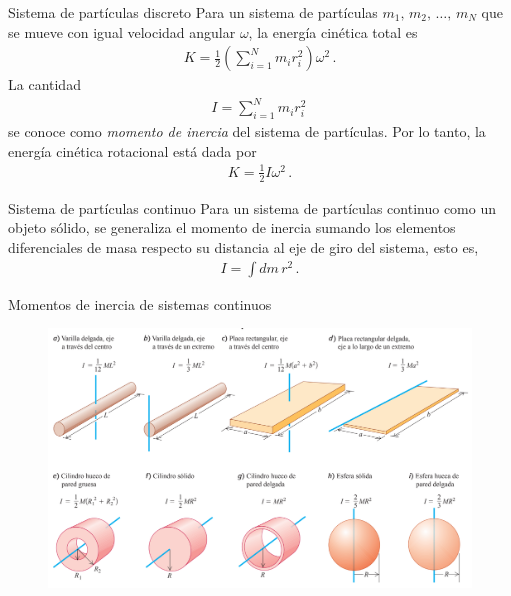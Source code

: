 \begin{frame}{Sistema de partículas discreto}
    Para un sistema de partículas $m_1,\,m_2,\,\dots,\,m_N$ que se mueve con igual velocidad angular $\omega$, la energía cinética total es \begin{align*}
        K=\frac{1}{2}\left(\sum_{i=1}^Nm_ir_i^2\right)\omega^2\,.
    \end{align*} La cantidad \begin{align*}
        I=\sum_{i=1}^Nm_ir_i^2\,
    \end{align*} se conoce como \textit{momento de inercia} del sistema de partículas. Por lo tanto, la energía cinética rotacional está dada por \begin{align*}
        K=\frac{1}{2}I\omega^2\,.
    \end{align*}
\end{frame}

\begin{frame}{Sistema de partículas continuo}
    Para un sistema de partículas continuo como un objeto sólido, se generaliza el momento de inercia sumando los elementos diferenciales de masa respecto su distancia al eje de giro del sistema, esto es, \begin{align*}
        I=\int dm\,r^2\,.
    \end{align*}
\end{frame}

\begin{frame}{Momentos de inercia de sistemas continuos}
    \begin{figure}
        \centering
        \includegraphics[width=\linewidth]{figures/momentos-de-inercia.png}
    \end{figure}
\end{frame}

